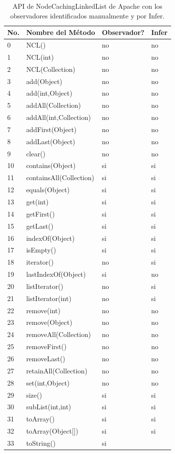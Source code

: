 \begin{table}[]
\centering
{\scriptsize
\begin{tabular}{|l|l|l||l|}
\hline
No. & Nombre del Método & Observador? & Infer\\
\hline
0 & NCL() & no & no \\
1 & NCL(int) & no & no\\
2 & NCL(Collection) & no & no\\
3 & add(Object) & no & no\\
4 & add(int,Object) & no & no\\
5 & addAll(Collection) & no & no\\
6 & addAll(int,Collection) & no & no \\
7 & addFirst(Object) & no & no \\
8 & addLast(Object) & no & no \\
9 & clear() & no & no\\
10 & contains(Object) & si & si \\
11 & containsAll(Collection) & si & si \\
12 & equals(Object) & si & si \\
13 & get(int) & si & si\\
14 & getFirst() & si & si \\
15 & getLast() & si & si \\
16 & indexOf(Object) & si & si\\
17 & isEmpty() & si & si\\
18 & iterator() & no & si \\
19 & lastIndexOf(Object) & si & no \\
20 & listIterator() & no & si \\
21 & listIterator(int) & no & si\\
22 & remove(int) & no & no \\
23 & remove(Object) & no & no \\
24 & removeAll(Collection) & no & no \\
25 & removeFirst() & no & no \\
26 & removeLast() & no& no  \\
27 & retainAll(Collection) & no& no  \\
28 & set(int,Object) & no& no  \\
29 & size() & si & si\\
30 & subList(int,int) & si& si\\
31 & toArray() & si & si\\
32 & toArray(Object[]) & si & si \\
33 & toString() & si \\
\hline
\end{tabular}
}
\caption{API de NodeCachingLinkedList de Apache con los observadores identificados manualmente y por Infer.}
\label{tab:ncl-api}
\end{table}



